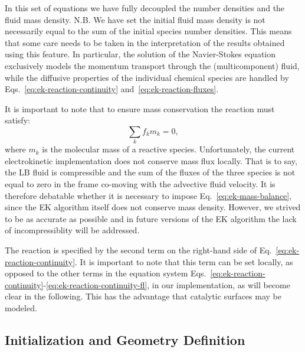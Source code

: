 In this set of equations we have fully decoupled the number densities and the
fluid mass density. N.B. We have set the initial fluid mass density is not necessarily 
equal to the sum of the initial species number densities. This means that 
some care needs to be taken in the interpretation of the results obtained using
this feature. In particular, the solution of the Navier-Stokes equation exclusively
models the momentum transport through the (multicomponent) fluid, while the diffusive
properties of the individual chemical species are handled by Eqs.~\eqref{eq:ek-reaction-continuity}
and~\eqref{eq:ek-reaction-fluxes}.

It is important to note that to ensure mass conservation the reaction must satisfy:
\begin{equation}
\label{eq:ek-mass-balance} \sum_{k} f_{k} m_{k} = 0 ,
\end{equation}
where $m_{k}$ is the molecular mass of a reactive species. Unfortunately, the current
electrokinetic implementation does not conserve mass flux locally. That is to say, the
LB fluid is compressible and the sum of the fluxes of the three species is not equal to
zero in the frame co-moving with the advective fluid velocity. It is therefore debatable
whether it is necessary to impose Eq.~\eqref{eq:ek-mass-balance}, since the EK algorithm
itself does not conserve mass density. However, we strived to be as accurate as
possible and in future versions of the EK algorithm the lack of incompressiblity will 
be addressed. 

The reaction is specified by the second term on the right-hand side of 
Eq.~\eqref{eq:ek-reaction-continuity}. It is important to note that this term
can be set locally, as opposed to the other terms in the equation system 
Eqs.~\eqref{eq:ek-reaction-continuity}-\eqref{eq:ek-reaction-continuity-fl}, in
our implementation, as will become clear in the following. This has the
advantage that catalytic surfaces may be modeled.

\subsection{\label{ssec:ek-reac-init}Initialization and Geometry Definition}

